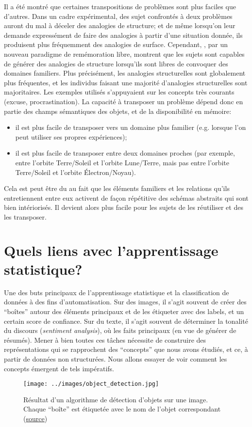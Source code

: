 \documentclass[french]{article}
\begin{document}
		Il a été montré que certaines transpositions de problèmes sont plus faciles que d'autres. Dans un cadre expérimental, des sujet confrontés à deux problèmes auront du mal à déceler des analogies de structure; et de même lorsqu'on leur demande expressément de faire des analogies à partir d'une situation donnée, ils produisent plus fréquemment des analogies de surface. Cependant, \cite{raynal2018}, par un nouveau paradigme de remémoration libre, montrent que les sujets sont capables de générer des analogies de structure lorsqu'ils sont libres de convoquer des domaines familiers. Plus précisément, les analogies structurelles sont globalement plus fréquentes, et les individus faisant une majorité d'analogies structurelles sont majoritaires. Les exemples utilisés s'appuyaient sur les concepts très courants (excuse, procrastination). La capacité à transposer un problème dépend donc en partie des champs sémantiques des objets, et de la disponibilité en mémoire:
		\begin{itemize}
			\item il est plus facile de transposer vers un domaine plus familier (e.g. lorsque l'on peut utiliser ses propres expériences);
			\item il est plus facile de transposer entre deux domaines proches (par exemple, entre l'orbite Terre/Soleil et l'orbite Lune/Terre, mais pas entre l'orbite Terre/Soleil et l'orbite Électron/Noyau).
		\end{itemize}		
		Cela est peut être du au fait que les éléments familiers et les relations qu'ils entretiennent entre eux activent de façon répétitive des schémas abstraits qui sont bien intériorisés. Il devient alors plus facile pour les sujets de les réutiliser et des les transposer.  
	\section{Quels liens avec l'apprentissage statistique?}
		Une des buts principaux de l'apprentissage statistique et la classification de données à des fins d'automatisation. Sur des images, il s'agit souvent de créer des ``boîtes'' autour des éléments principaux et de les étiqueter avec des labels, et un certain score de confiance. Sur du texte, il s'agit souvent de déterminer la tonalité du discours (\textit{sentiment analysis}), où les faits principaux (en vue de générer de résumés). Mener à bien toutes ces tâches nécessite de construire des représentations qui se rapprochent des ``concepts'' que nous avons étudiés, et ce, à partir de données non structurées. Nous allons essayer de voir comment les concepts émergent de tels impératifs.
		\begin{figure}[H]
			\centering
			\texttt{[image: ../images/object\_detection.jpg]}
			\caption{Résultat d'un algorithme de détection d'objets sur une image. Chaque ``boîte'' est étiquetée avec le nom de l'objet correspondant (\href{https://upload.wikimedia.org/wikipedia/commons/3/38/Detected-with-YOLO--Schreibtisch-mit-Objekten.jpg}{source})}
		\end{figure}
\end{document}
